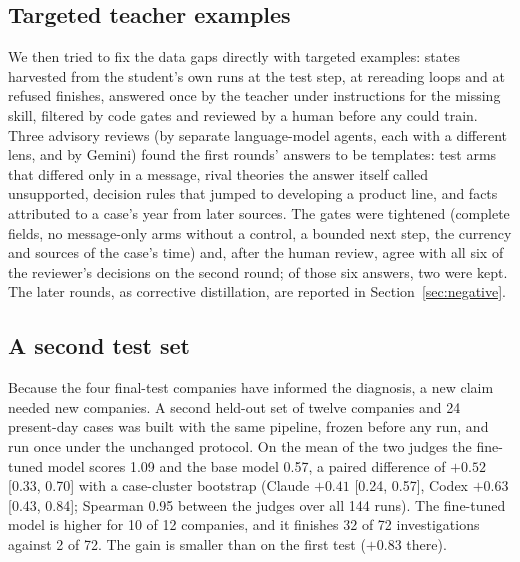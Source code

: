 \subsection{Targeted teacher examples}
We then tried to fix the data gaps directly with targeted examples: states harvested from the student's own runs at the
test step, at rereading loops and at refused finishes, answered once by the teacher under instructions for the missing
skill, filtered by code gates and reviewed by a human before any could train. Three advisory reviews (by separate
language-model agents, each with a different lens, and by Gemini) found the first rounds' answers to be templates: test
arms that differed only in a message, rival theories the answer itself called unsupported, decision rules that jumped to
developing a product line, and facts attributed to a case's year from later sources. The gates were tightened (complete
fields, no message-only arms without a control, a bounded next step, the currency and sources of the case's time) and,
after the human review, agree with all six of the reviewer's decisions on the second round; of those six answers, two were
kept. The later rounds, as corrective distillation, are reported in Section~\ref{sec:negative}.

\subsection{A second test set}
Because the four final-test companies have informed the diagnosis, a new claim needed new companies. A second held-out
set of twelve companies and 24 present-day cases was built with the same pipeline, frozen before any run, and run once
under the unchanged protocol. On the mean of the two judges the fine-tuned model scores 1.09 and the base model 0.57, a
paired difference of $+0.52$ [0.33, 0.70] with a case-cluster bootstrap (Claude $+0.41$ [0.24, 0.57], Codex $+0.63$
[0.43, 0.84]; Spearman 0.95 between the judges over all 144 runs). The fine-tuned model is higher for 10 of 12
companies, and it finishes 32 of 72 investigations against 2 of 72. The gain is smaller than on the first test
($+0.83$ there).

